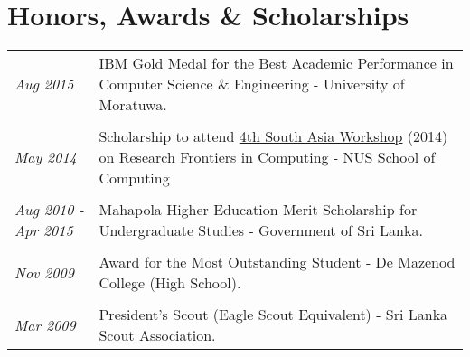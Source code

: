 \documentclass[a4paper,10pt]{article}
\begin{document}




\section{Honors, Awards \& Scholarships}
\begin{tabular}{p{3cm}|p{13.5cm}}
\emph{Aug 2015} & \href{https://goo.gl/Q3SrQX}{IBM Gold Medal} for the Best Academic Performance in Computer Science \& Engineering - University of Moratuwa.\\\\
\emph{May 2014} & Scholarship to attend \href{https://goo.gl/lDpCe5}{4th South Asia Workshop} (2014) on Research Frontiers in Computing - NUS School of Computing\\\\
\emph{Aug 2010 - Apr 2015} & Mahapola Higher Education Merit Scholarship for Undergraduate Studies - Government of Sri Lanka.\\\\
\emph{Nov 2009} & Award for the Most Outstanding Student - De Mazenod College (High School).\\\\
\emph{Mar 2009} & President’s Scout (Eagle Scout Equivalent) - Sri Lanka Scout Association.\\
\end{tabular}\\
\end{document}
